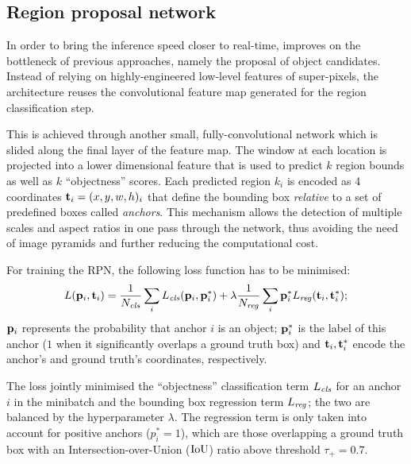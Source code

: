 
	\subsection{Region proposal network}\label{sec:frcnn_rpn}
		In order to bring the inference speed closer to real-time, \FRCNN{} improves on the bottleneck of previous approaches, namely the proposal of object candidates. Instead of relying on highly-engineered low-level features of super-pixels, the architecture reuses the convolutional feature map generated for the region classification step.

		This is achieved through another small, fully-convolutional network which is slided along the final layer of the feature map. The window at each location is projected into a lower dimensional feature that is used to predict \(k\) region bounds as well as \(k\) ``objectness'' scores. Each predicted region \(k_i\) is encoded as 4 coordinates \(\mathbf{t}_i = (x, y, w, h)_i\) that define the bounding box \emph{relative} to a set of predefined boxes called \emph{anchors}. This mechanism allows the detection of multiple scales and aspect ratios in one pass through the network, thus avoiding the need of image pyramids and further reducing the computational cost.

		For training the RPN, the following loss function has to be minimised:
		\begin{equation*}\label{eq:rpn_loss}
		L(\mathbf{p}_i, \mathbf{t}_i) =
			\frac{1}{N_{\mathit{cls}}}\sum_i L_{\mathit{cls}}(\mathbf{p}_i, \mathbf{p}^{*}_i)
			+ \lambda\frac{1}{N_{\mathit{reg}}}\sum_i  \mathbf{p}^{*}_i L_{\mathit{reg}}(\mathbf{t}_i, \mathbf{t}^{*}_i);
		\end{equation*}
		\(\mathbf{p}_i\) represents the probability that anchor \(i\) is an object; \(\mathbf{p}^{*}_i\) is the label of this anchor (\(1\) when it significantly overlaps a ground truth box) and \(\mathbf{t}_i, \mathbf{t}^{*}_i\) encode the anchor's and ground truth's coordinates, respectively.

		The loss jointly minimised  the ``objectness'' classification term \(L_{\mathit{cls}}\) for an anchor \(i\) in the minibatch and the bounding box regression term \(L_{\mathit{reg}}\); the two are balanced by the hyperparameter \(\lambda\). The regression term is only taken into account for positive anchors (\(p^{*}_i = 1\)), which are those overlapping a ground truth box with an Intersection-over-Union (\(\operatorname{IoU}\)) ratio above threshold \(\tau_+ = 0.7\).

